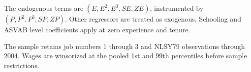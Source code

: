 \begin{table}[p]
\begin{threeparttable}
\begin{tablenotes}[flushleft]
\item The endogenous terms are $(E,E^2,E^3,SE,ZE)$, instrumented by $(P,P^2,P^3,SP,ZP)$. Other regressors are treated as exogenous. Schooling and ASVAB level coefficients apply at zero experience and tenure.
\item The sample retains job numbers 1 through 3 and NLSY79 observations through 2004. Wages are winsorized at the pooled 1st and 99th percentiles before sample restrictions.
\end{tablenotes}\end{threeparttable}\end{table}
